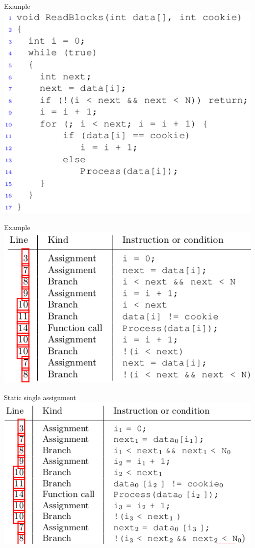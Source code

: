 \documentclass{beamer}
\begin{document}
\begin{frame}{Example}
\includegraphics[scale=0.5]{example1.png}
\end{frame}

\begin{frame}{Example}
\includegraphics[scale=0.5]{trace1.png}
\end{frame}

\begin{frame}{Static single assignment}
\includegraphics[scale=0.5]{static_single_assignment.png}
\end{frame}
\end{document}
